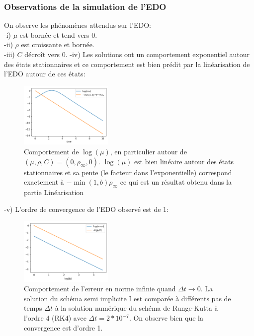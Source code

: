 \documentclass[11pt]{article}
\begin{document}
\subsubsection{Observations de la simulation de l'EDO}
 On observe les phénomènes attendus sur l'EDO:\\
 -i) $\mu$ est bornée et tend vers 0.\\
 -ii) $\rho$ est croissante et bornée.\\
 -iii) $C$ décroît vers 0.
 \newpage
 -iv) Les solutions ont un comportement exponentiel autour des états stationnaires et ce comportement est bien prédit par la linéarisation de l'EDO autour de ces états:

\begin{figure}
\includegraphics[width=0.4\textwidth]{Images/linearisation.png}
\caption{Comportement de $\log(\mu)$, en particulier autour de $(\mu,\rho,C) =  (0,\rho_\infty,0)$. $\log(\mu)$ est bien linéaire autour des états stationnaires et sa pente (le facteur dans l'exponentielle) correspond exactement à $-\min(1,b)\rho_\infty$ ce qui est un résultat obtenu dans la partie Linéarisation } 
\end{figure} 
 
 -v) L'ordre de convergence de l'EDO observé est de 1:
\begin{figure}
\includegraphics[width=0.4\textwidth]{Images/ordrecvedo.png}
\caption{Comportement de l'erreur en norme infinie quand $\Delta t \to  0$. La solution du schéma semi implicite I est comparée à différents pas de temps $\Delta t$ à la solution numérique du schéma de Runge-Kutta à l'ordre 4 (RK4) avec $\Delta t = 2*10^{-7}$. On observe bien que la convergence est d'ordre 1.}
\end{figure} 
\end{document}
